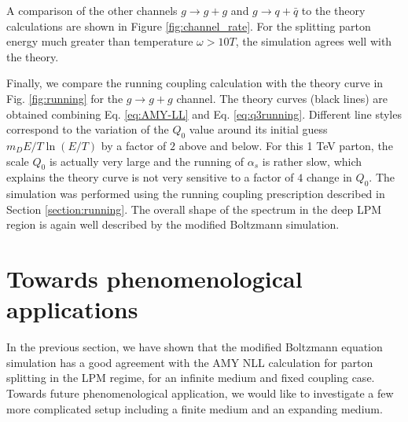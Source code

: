 \documentclass[aps, prc, reprint, amsmath, groupedaddress, nofootinbib]{revtex4-1}
\begin{document}
A comparison of the other channels $g\rightarrow g+g$ and $g\rightarrow q+\bar{q}$ to the theory calculations are shown in Figure \ref{fig:channel_rate}.
For the splitting parton energy much greater than temperature $\omega > 10 T$, the simulation agrees well with the theory. 

Finally, we compare the running coupling calculation with the theory curve in Fig. \ref{fig:running} for the $g\rightarrow g+g$ channel.
The theory curves (black lines) are obtained combining Eq. \ref{eq:AMY-LL} and Eq. \ref{eq:q3running}.
Different line styles correspond to the variation of the $Q_0$ value around its initial guess $m_D E/T \ln(E/T)$ by a factor of $2$ above and below.
For this 1 TeV parton, the scale $Q_0$ is actually very large and the running of $\alpha_s$ is rather slow, which explains the theory curve is not very sensitive to a factor of $4$ change in $Q_0$.
The simulation was performed using the running coupling prescription described in Section \ref{section:running}.
The overall shape of the spectrum in the deep LPM region is again well described by the modified Boltzmann simulation. 


\section{Towards phenomenological applications}\label{section:more}
In the previous section, we have shown that the modified Boltzmann equation simulation has a good agreement with the AMY NLL calculation for parton splitting in the LPM regime, for an infinite medium and fixed coupling case.
Towards future phenomenological application, we would like to investigate a few more complicated setup including a finite medium and an expanding medium.
\end{document}
